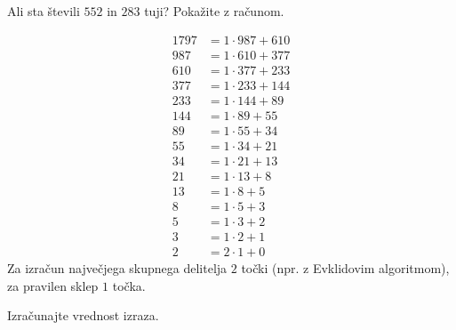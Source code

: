 \documentclass[addpoints,12pt]{exam}
\begin{document}
\begin{questions}


        \question[3]
        Ali sta števili $552$ in $283$ tuji? Pokažite z računom.
        
        \begin{solution}
            \begin{align*}
                1797&=1\cdot 987+610\\
                987&=1\cdot 610+377 \\
                610&=1\cdot 377+233 \\
                377&=1\cdot 233+144 \\
                233&=1\cdot 144+89 \\
                144&=1\cdot 89+55 \\
                89&=1\cdot 55+34 \\
                55&=1\cdot 34+21 \\
                34&=1\cdot 21+13 \\
                21&=1\cdot 13+8 \\
                13&=1\cdot 8+5 \\
                8&=1\cdot 5+3 \\
                5&=1\cdot 3+2 \\
                3&=1\cdot 2+1 \\
                2&=2\cdot 1+0
            \end{align*}
            Za izračun največjega skupnega delitelja $2$ točki (npr. z Evklidovim algoritmom), za pravilen sklep $1$ točka.
        \end{solution}
    

    \question
    Izračunajte vrednost izraza.
\end{questions}
\end{document}

